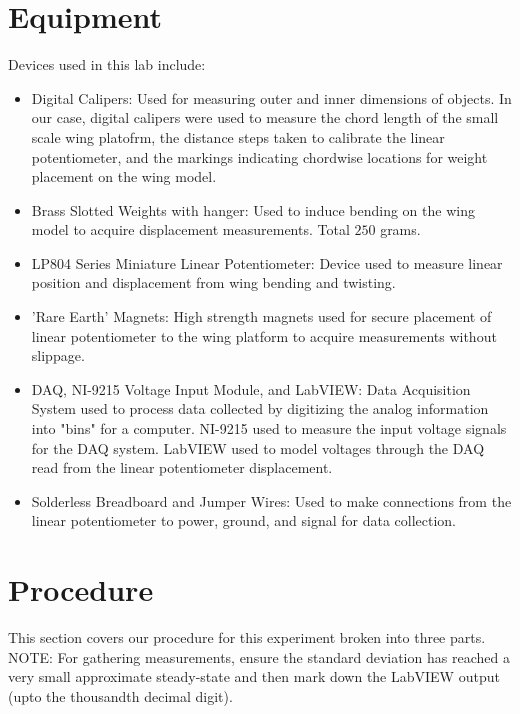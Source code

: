 \documentclass{article}
\begin{document}
\section{Equipment}
Devices used in this lab include:
\begin{itemize}

\item Digital Calipers: Used for measuring outer and inner dimensions of objects. In our case, digital calipers were used to measure the chord length of the small scale wing platofrm, the distance steps taken to calibrate the linear potentiometer, and the markings indicating chordwise locations for weight placement on the wing model.
\vspace{2.5mm}

\item Brass Slotted Weights with hanger: Used to induce bending on the wing model to acquire displacement measurements. Total $250$ grams.
\vspace{2.5mm}

\item LP804 Series Miniature Linear Potentiometer: Device used to measure linear position and displacement from wing bending and twisting.
\vspace{2.5mm}

\item 'Rare Earth' Magnets: High strength magnets used for secure placement of linear potentiometer to the wing platform to acquire measurements without slippage.
\vspace{2.5mm}

\item DAQ, NI-9215 Voltage Input Module, and LabVIEW: Data Acquisition System used to process data collected by digitizing the analog information into "bins" for a computer. NI-9215 used to measure the input voltage signals for the DAQ system. LabVIEW used to model voltages through the DAQ read from the linear potentiometer displacement.
\vspace{2.5mm}

\item Solderless Breadboard and Jumper Wires: Used to make connections from the linear potentiometer to power, ground, and signal for data collection.

\end{itemize}

\section{Procedure}
This section covers our procedure for this experiment broken into three parts. NOTE: For gathering measurements, ensure the standard deviation has reached a very small approximate steady-state and then mark down the LabVIEW output (upto the thousandth decimal digit).
\end{document}
